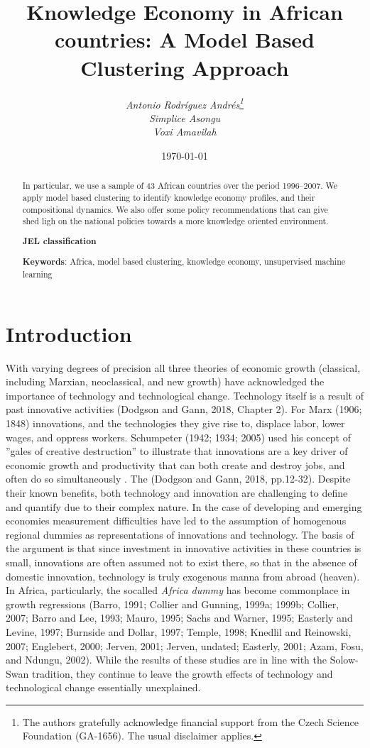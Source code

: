 \documentclass[11pt]{article}
\title{\bfseries\Large  Knowledge Economy in African countries: A Model Based Clustering Approach \vspace*{-1ex}}
\author{\large\itshape Antonio Rodr\'{i}guez Andr\'{e}s\thanks{The authors gratefully acknowledge financial support from the Czech Science Foundation (GA-1656). The usual disclaimer applies. } \\ Simplice Asongu\\ Voxi Amavilah}
\date{\today}
\begin{document}
\maketitle

\begin{abstract}

In particular, we use a sample of 43 African countries over the period 1996--2007.  We apply model based clustering to identify knowledge economy profiles, and their compositional dynamics. We also offer some policy recommendations that can give shed ligh on the national policies towards a more knowledge oriented environment.

\textbf{JEL classification}
\smallskip

\textbf{Keywords}: Africa, model based clustering, knowledge economy, unsupervised machine learning
\end{abstract}

\section{Introduction}
With varying degrees of precision all three theories of economic growth (classical, including Marxian, neoclassical, and new growth) have acknowledged the importance of technology and technological change. Technology itself is a result of past innovative activities (Dodgson and Gann, 2018, Chapter 2). For Marx (1906; 1848) innovations, and the technologies they give rise to, displace labor, lower wages, and oppress workers. Schumpeter (1942; 1934; 2005) used his concept of ''gales of creative destruction'' to illustrate that innovations are a key driver of economic growth and productivity that can both create and destroy jobs, and often do so simultaneously \cite{Becker2005}. The  (Dodgson and Gann, 2018, pp.12-32). Despite their known benefits, both technology and innovation are challenging to define and quantify due to their complex nature. In the case of developing and emerging economies measurement difficulties have led to the assumption of homogenous regional dummies as representations of innovations and technology. The basis of the argument is that since investment in innovative activities in these countries is small, innovations are often assumed not to exist there, so that in the absence of domestic innovation, technology is truly exogenous manna from abroad (heaven). In Africa, particularly, the socalled \emph{Africa dummy} has become commonplace in growth regressions (Barro, 1991; Collier and Gunning, 1999a; 1999b; Collier, 2007; Barro and Lee, 1993; Mauro, 1995; Sachs and Warner, 1995; Easterly and Levine, 1997; Burnside and Dollar, 1997; Temple, 1998; Knedlil and Reinowski, 2007; Englebert, 2000; Jerven, 2001; Jerven, undated; Easterly, 2001; Azam, Fosu, and Ndungu, 2002). While the results of these studies are in line with the Solow-Swan tradition, they continue to leave the growth effects of technology and technological change essentially unexplained.
\end{document}

